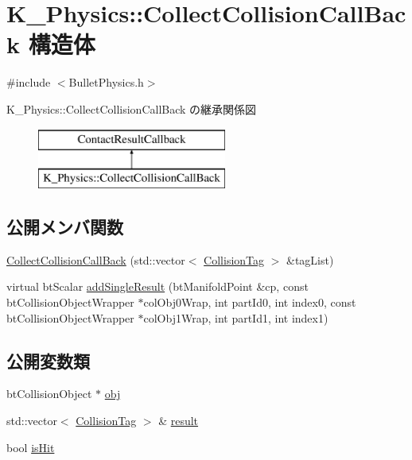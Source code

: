 \hypertarget{struct_k___physics_1_1_collect_collision_call_back}{}\section{K\+\_\+\+Physics\+:\+:Collect\+Collision\+Call\+Back 構造体}
\label{struct_k___physics_1_1_collect_collision_call_back}


{\ttfamily \#include $<$Bullet\+Physics.\+h$>$}

K\+\_\+\+Physics\+:\+:Collect\+Collision\+Call\+Back の継承関係図\begin{figure}[H]
\begin{center}
\leavevmode
\includegraphics[height=2.000000cm]{struct_k___physics_1_1_collect_collision_call_back}
\end{center}
\end{figure}
\subsection*{公開メンバ関数}
\begin{DoxyCompactItemize}
\item 
\mbox{\hyperlink{struct_k___physics_1_1_collect_collision_call_back_af31aa674f34cfe4dcf0e50a4ac7e0a28}{Collect\+Collision\+Call\+Back}} (std\+::vector$<$ \mbox{\hyperlink{struct_k___physics_1_1_collision_tag}{Collision\+Tag}} $>$ \&tag\+List)
\item 
virtual bt\+Scalar \mbox{\hyperlink{struct_k___physics_1_1_collect_collision_call_back_aab1f994d72f55d819b7cf0a1a371d0ac}{add\+Single\+Result}} (bt\+Manifold\+Point \&cp, const bt\+Collision\+Object\+Wrapper $\ast$col\+Obj0\+Wrap, int part\+Id0, int index0, const bt\+Collision\+Object\+Wrapper $\ast$col\+Obj1\+Wrap, int part\+Id1, int index1)
\end{DoxyCompactItemize}
\subsection*{公開変数類}
\begin{DoxyCompactItemize}
\item 
bt\+Collision\+Object $\ast$ \mbox{\hyperlink{struct_k___physics_1_1_collect_collision_call_back_ac95b38d8abfd6f8cf868ac42878d4dba}{obj}}
\item 
std\+::vector$<$ \mbox{\hyperlink{struct_k___physics_1_1_collision_tag}{Collision\+Tag}} $>$ \& \mbox{\hyperlink{struct_k___physics_1_1_collect_collision_call_back_aa0b6872894b53f34f5c69d14eb23aada}{result}}
\item 
bool \mbox{\hyperlink{struct_k___physics_1_1_collect_collision_call_back_a22aa53d54265d3f318754626ba06031a}{is\+Hit}}
\end{DoxyCompactItemize}


